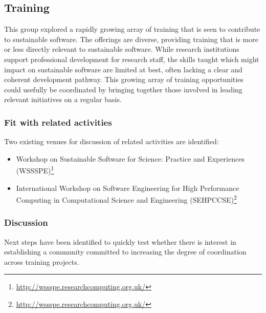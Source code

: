 \subsection{Training}


This group explored a rapidly growing array of training that is seen to
contribute to sustainable software. The offerings are diverse, providing
training that is more or less directly relevant to sustainable software. While
research institutions support professional development for research staff, the
skills taught which might impact on sustainable software are limited at best,
often lacking a clear and coherent development pathway. This growing array of
training opportunities could usefully be coordinated by bringing together those
involved in leading relevant initiatives on a regular basis.

\subsubsection{Fit with related activities} Two existing venues for discussion
of related activities are identified:

\begin{itemize}

\item Workshop on Sustainable Software for Science: Practice and
Experiences (WSSSPE)\footnote{\url{http://wssspe.researchcomputing.org.uk/}}

\item  International Workshop on Software Engineering for High
Performance Computing in Computational Science and
Engineering (SEHPCCSE)\footnote{\url{http://wssspe.researchcomputing.org.uk/}}

\end{itemize}

\subsubsection{Discussion}

Next steps have been identified to quickly test whether there is interest in
establishing a community committed to increasing the degree of coordination
across training projects.

